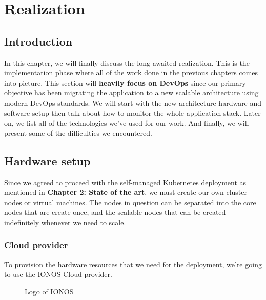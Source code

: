 \chapter{Realization}
\minitoc
\newpage

\setcounter{secnumdepth}{0} %
\section{Introduction}
In this chapter, we will finally discuss the long awaited realization.
This is the implementation phase where all of the work done in the previous chapters comes into picture.
This section will {\bf heavily focus on DevOps} since our primary objective has been migrating the  application to a new scalable architecture using modern DevOps standards.
We will start with the new architecture hardware and software setup then talk about how to monitor the whole application stack.
Later on, we list all of the technologies we've used for our work.
And finally, we will present some of the difficulties we encountered.

\setcounter{secnumdepth}{2} %
\section{Hardware setup}
Since we agreed to proceed with the self-managed Kubernetes deployment as mentioned in \textbf{Chapter 2: State of the art}, we must create our own cluster nodes or virtual machines.
The nodes in question can be separated into the core nodes that are create once, and the scalable nodes that can be created indefinitely whenever we need to scale.

\subsection{Cloud provider}
To provision the hardware resources that we need for the deployment, we're going  to use the IONOS Cloud provider.
\cite[Ionos is a web hosting company founded in Germany in 1988 and is currently owned by United Internet.]{ionos-wikipedia}
\begin{figure}[H]
    \centering
    \caption{Logo of IONOS}
    \label{fig:logo-of-ionos-cloud}
\end{figure}

